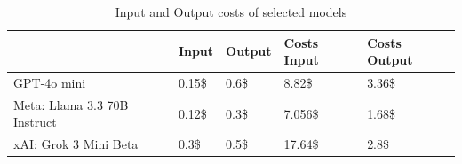 \documentclass[12pt]{article}
\begin{document}
    
\begin{table}[ht!]
\begin{center}

\begin{tabular}{|l|l|l|l|l|}
\hline
                             & Input & Output & Costs Input & Costs Output   \\ \hline
GPT-4o mini                  & 0.15\$  & 0.6\$ & 8.82\$ & 3.36\$   \\\hline
Meta: Llama 3.3 70B Instruct & 0.12\$  & 0.3\$ & 7.056\$ & 1.68\$   \\\hline
xAI: Grok 3 Mini Beta        & 0.3\$   & 0.5\$ & 17.64\$ & 2.8\$ \\ \hline
\end{tabular}
\caption{Input and Output costs of selected models}
\end{center}

\end{table}





\begin{multicols}{2}
    







\end{multicols}
\end{document}
